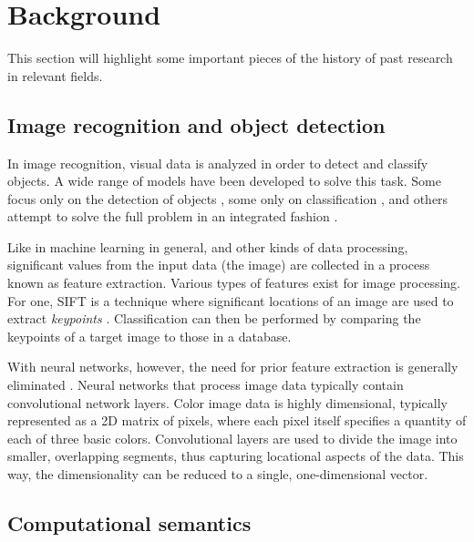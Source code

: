 \renewcommand{\sectionautorefname}{Section}
\let\subsectionautorefname\sectionautorefname
\let\subsubsectionautorefname\sectionautorefname
\glsresetall
\section{Background}
\label{sec:background}

This section will highlight some important pieces of the history of past research in relevant fields.

\subsection{Image recognition and object detection}

In image recognition, visual data is analyzed in order to detect and classify objects.
A wide range of models have been developed to solve this task.
Some focus only on the detection of objects \citep{BlaschkoLearningLocalizeObjects2008}, some only on classification \citep[e.g. ResNet,][]{HeDeepResidualLearning2015}, and others attempt to solve the full problem in an integrated fashion \citep{RedmonYouOnlyLook2015,HeMaskRCNN2017}.

Like in machine learning in general, and other kinds of data processing, significant values from the input data (the image) are collected in a process known as feature extraction.
Various types of features exist for image processing.
For one, SIFT is a technique where significant locations of an image are used to extract \textit{keypoints} \citep{LoweObjectrecognitionlocal1999}.
Classification can then be performed by comparing the keypoints of a target image to those in a database.

With neural networks, however, the need for prior feature extraction is generally eliminated \citep{HeDeepResidualLearning2015, HeMaskRCNN2017}.
Neural networks that process image data typically contain convolutional network layers.
Color image data is highly dimensional, typically represented as a 2D matrix of pixels, where each pixel itself specifies a quantity of each of three basic colors.
Convolutional layers are used to divide the image into smaller, overlapping segments, thus capturing locational aspects of the data.
This way, the dimensionality can be reduced to a single, one-dimensional vector.



\subsection{Computational semantics}
\label{sec:compsem}

